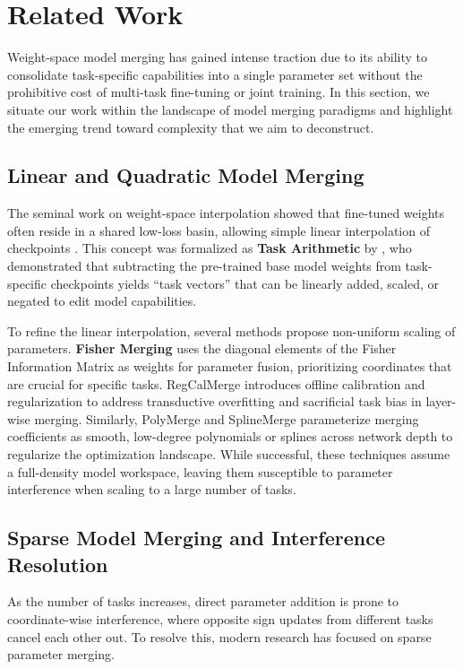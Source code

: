 \section{Related Work}
\label{sec:related_work}

Weight-space model merging has gained intense traction due to its ability to consolidate task-specific capabilities into a single parameter set without the prohibitive cost of multi-task fine-tuning or joint training. In this section, we situate our work within the landscape of model merging paradigms and highlight the emerging trend toward complexity that we aim to deconstruct.

\subsection{Linear and Quadratic Model Merging}
The seminal work on weight-space interpolation showed that fine-tuned weights often reside in a shared low-loss basin, allowing simple linear interpolation of checkpoints \cite{Wortsman2022}. This concept was formalized as \textbf{Task Arithmetic} by \citet{Ilharco2022}, who demonstrated that subtracting the pre-trained base model weights from task-specific checkpoints yields ``task vectors'' that can be linearly added, scaled, or negated to edit model capabilities. 

To refine the linear interpolation, several methods propose non-uniform scaling of parameters. \textbf{Fisher Merging} \cite{Matena2022} uses the diagonal elements of the Fisher Information Matrix as weights for parameter fusion, prioritizing coordinates that are crucial for specific tasks. RegCalMerge \cite{RegCalMerge2024} introduces offline calibration and regularization to address transductive overfitting and sacrificial task bias in layer-wise merging. Similarly, PolyMerge and SplineMerge \cite{PolyMerge2025} parameterize merging coefficients as smooth, low-degree polynomials or splines across network depth to regularize the optimization landscape. While successful, these techniques assume a full-density model workspace, leaving them susceptible to parameter interference when scaling to a large number of tasks.

\subsection{Sparse Model Merging and Interference Resolution}
As the number of tasks increases, direct parameter addition is prone to coordinate-wise interference, where opposite sign updates from different tasks cancel each other out. To resolve this, modern research has focused on sparse parameter merging. 

